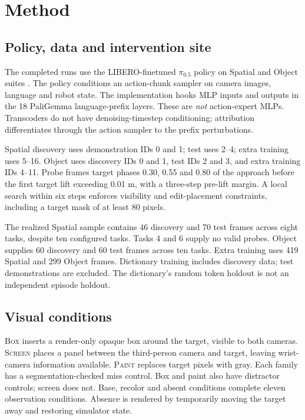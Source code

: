 \documentclass{article}
\begin{document}
\section{Method}
\subsection{Policy, data and intervention site}
The completed runs use the LIBERO-finetuned $\pi_{0.5}$ policy on Spatial and Object suites \citep{pi2025pi05,liu2023libero}. The policy conditions an action-chunk sampler on camera images, language and robot state. The implementation hooks MLP inputs and outputs in the 18 PaliGemma language-prefix layers. These are \emph{not} action-expert MLPs. Transcoders do not have denoising-timestep conditioning; attribution differentiates through the action sampler to the prefix perturbations.

Spatial discovery uses demonstration IDs 0 and 1; test uses 2--4; extra training uses 5--16. Object uses discovery IDs 0 and 1, test IDs 2 and 3, and extra training IDs 4--11. Probe frames target phases 0.30, 0.55 and 0.80 of the approach before the first target lift exceeding 0.01 m, with a three-step pre-lift margin. A local search within six steps enforces visibility and edit-placement constraints, including a target mask of at least 80 pixels.

The realized Spatial sample contains 46 discovery and 70 test frames across eight tasks, despite ten configured tasks. Tasks 4 and 6 supply no valid probes. Object supplies 60 discovery and 60 test frames across ten tasks. Extra training uses 419 Spatial and 299 Object frames. Dictionary training includes discovery data; test demonstrations are excluded. The dictionary's random token holdout is not an independent episode holdout.

\subsection{Visual conditions}
\textsc{Box} inserts a render-only opaque box around the target, visible to both cameras. \textsc{Screen} places a panel between the third-person camera and target, leaving wrist-camera information available. \textsc{Paint} replaces target pixels with gray. Each family has a segmentation-checked miss control. Box and paint also have distractor controls; screen does not. Base, recolor and absent conditions complete eleven observation conditions. Absence is rendered by temporarily moving the target away and restoring simulator state.
\end{document}
